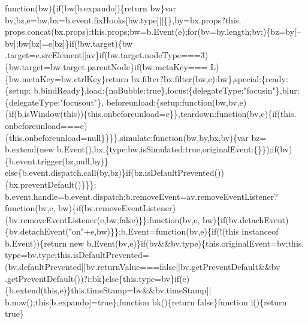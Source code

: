 \begin{DoxyCode}
{      function}(bw)\{\textcolor{keywordflow}{if}(bw[b.expando])\{\textcolor{keywordflow}{return} bw\}var bv,bz,e=bw,bx=b.event.fixHooks[bw.type]||\{\},by=bx.props?this.
      props.concat(bx.props):this.props;bw=b.Event(e);\textcolor{keywordflow}{for}(bv=by.length;bv;)\{bz=by[--bv];bw[bz]=e[bz]\}\textcolor{keywordflow}{if}(!bw.target)\{bw
      .target=e.srcElement||av\}\textcolor{keywordflow}{if}(bw.target.nodeType===3)\{bw.target=bw.target.parentNode\}\textcolor{keywordflow}{if}(bw.metaKey===
      L)\{bw.metaKey=bw.ctrlKey\}\textcolor{keywordflow}{return} bx.filter?bx.filter(bw,e):bw\},special:\{ready:\{setup:
      b.bindReady\},load:\{noBubble:\textcolor{keyword}{true}\},focus:\{delegateType:\textcolor{stringliteral}{"focusin"}\},blur:\{delegateType:\textcolor{stringliteral}{"focusout"}\},
      beforeunload:\{setup:\textcolor{keyword}{function}(bw,bv,e)\{\textcolor{keywordflow}{if}(b.isWindow(\textcolor{keyword}{this}))\{this.onbeforeunload=e\}\},teardown:\textcolor{keyword}{function}(bv,e)\{\textcolor{keywordflow}{if}(this.
      onbeforeunload===e)\{this.onbeforeunload=null\}\}\}\},simulate:\textcolor{keyword}{function}(bw,by,bx,bv)\{var bz=
      b.extend(\textcolor{keyword}{new} b.Event(),bx,\{type:bw,isSimulated:\textcolor{keyword}{true},originalEvent:\{\}\});\textcolor{keywordflow}{if}(bv)\{b.event.trigger(bz,null,by)\}\textcolor{keywordflow}{
      else}\{b.event.dispatch.call(by,bz)\}\textcolor{keywordflow}{if}(bz.isDefaultPrevented())\{bx.preventDefault()\}\}\};
      b.event.handle=b.event.dispatch;b.removeEvent=av.removeEventListener?\textcolor{keyword}{function}(bv,e,
      bw)\{\textcolor{keywordflow}{if}(bv.removeEventListener)\{bv.removeEventListener(e,bw,\textcolor{keyword}{false})\}\}:\textcolor{keyword}{function}(bv,e,
      bw)\{\textcolor{keywordflow}{if}(bv.detachEvent)\{bv.detachEvent(\textcolor{stringliteral}{"on"}+e,bw)\}\};b.Event=\textcolor{keyword}{function}(bv,e)\{\textcolor{keywordflow}{if}(!(\textcolor{keyword}{this} instanceof 
      b.Event))\{\textcolor{keywordflow}{return} \textcolor{keyword}{new} b.Event(bv,e)\}\textcolor{keywordflow}{if}(bv&&bv.type)\{this.originalEvent=bv;this.
      type=bv.type;this.isDefaultPrevented=(bv.defaultPrevented||bv.returnValue===\textcolor{keyword}{false}||bv.getPreventDefault&&bv
      .getPreventDefault())?i:bk\}\textcolor{keywordflow}{else}\{this.type=bv\}\textcolor{keywordflow}{if}(e)\{b.extend(\textcolor{keyword}{this},e)\}this.timeStamp=bv&&bv.timeStamp||
      b.now();\textcolor{keyword}{this}[b.expando]=\textcolor{keyword}{true}\};\textcolor{keyword}{function} bk()\{\textcolor{keywordflow}{return} \textcolor{keyword}{false}\}\textcolor{keyword}{function} i()\{\textcolor{keywordflow}{return} \textcolor{keyword}{true}\}

\end{DoxyCode}
